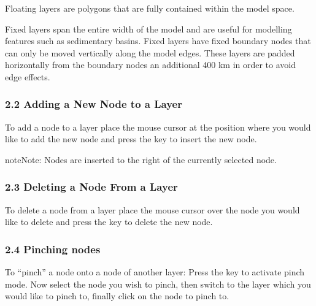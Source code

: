 \documentclass[a4paper,10pt,english]{sphinxmanual}
\begin{document}

Floating layers are polygons that are fully contained within the model space.


Fixed layers span the entire width of the model and are useful for modelling features such as sedimentary basins.
Fixed layers have fixed boundary nodes that can only be moved vertically along the model edges.
These layers are padded horizontally from the boundary nodes an additional 400 km in order to avoid edge effects.

\begin{DUlineblock}{0em}
\item[] 
\end{DUlineblock}


\subsubsection{2.2 Adding a New Node to a Layer}
\label{\detokenize{manual_layer_nodes:adding-a-new-node-to-a-layer}}
To add a node to a layer place the mouse cursor at the position where you would like to add the new node and
press the  key to insert the new node.

\begin{sphinxadmonition}{note}{Note:}
Nodes are inserted to the right of the currently selected node.
\end{sphinxadmonition}

\begin{DUlineblock}{0em}
\item[] 
\end{DUlineblock}


\subsubsection{2.3 Deleting a Node From a Layer}
\label{\detokenize{manual_layer_nodes:deleting-a-node-from-a-layer}}
To delete a node from a layer place the mouse cursor over the node you would like to delete and
press the  key to delete the new node.

\begin{DUlineblock}{0em}
\item[] 
\end{DUlineblock}


\subsubsection{2.4 Pinching nodes}
\label{\detokenize{manual_layer_nodes:pinching-nodes}}
To “pinch” a node onto a node of another layer: Press the  key to activate pinch mode.
Now select the node you wish to pinch, then switch to the layer which you would like to pinch
to, finally click on the node to pinch to.
\end{document}
